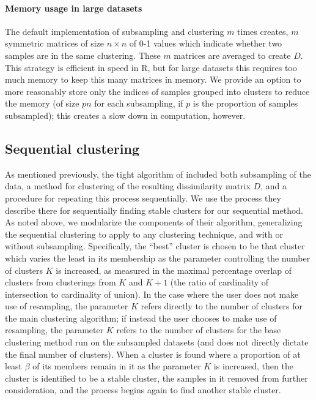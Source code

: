 \paragraph{Memory usage in large datasets}

The default implementation of subsampling and clustering $m$ times creates, $m$ symmetric matrices of size $n\times n$ of 0-1 values which indicate whether two samples are in the same clustering. These $m$ matrices are averaged to create $D$. This strategy is efficient in speed in R, but for large datasets this requires too much memory to keep this many matrices in memory. We provide an option to more reasonably store only the indices of samples grouped into clusters to reduce the memory (of size $pn$ for each subsampling, if $p$ is the proportion of samples subsampled); this creates a slow down in computation, however.

\subsection{Sequential clustering} 

As mentioned previously, the tight algorithm of \cite{Tseng:2005ir} included both subsampling of the data, a method for clustering of the resulting dissimilarity matrix $D$, and a procedure for repeating this process sequentially. We use the process they describe there for sequentially finding stable clusters for our sequential method. As noted above, we modularize the components of their algorithm, generalizing the sequential clustering to apply to any clustering technique, and with or without subsampling. Specifically, the ``best'' cluster is chosen to be that cluster which varies the least in its membership as the parameter controlling the number of clusters $K$ is increased, as measured in the maximal percentage overlap of clusters from clusterings from $K$ and $K+1$ (the ratio of cardinality of intersection to cardinality of union). In the case where the user does not make use of resampling, the parameter $K$ refers directly to the number of clusters for the main clustering algorithm; if instead the user chooses to make use of resampling, the parameter $K$ refers to the number of clusters for the base clustering method run on the subsampled datasets (and does not directly dictate the final number of clusters). When a cluster is found where a proportion of at least $\beta$ of its members remain in it as the parameter $K$ is increased, then the cluster is identified to be a stable cluster, the samples in it removed from further consideration, and the process begins again to find another stable cluster.

